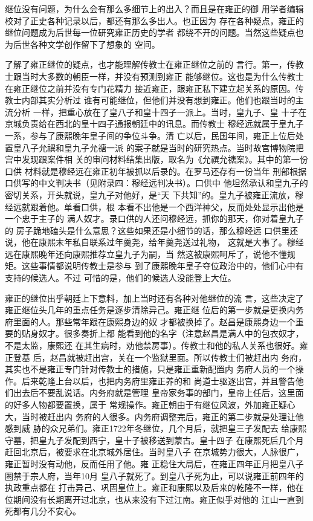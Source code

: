 继位没有问题，为什么会有那么多细节上的出入？而且是在雍正的御%
用学者编辑校对了正史各种记录以后，都还有那么多出人。也正因为%
存在各种疑点，雍正的继位问题成为后世每一位研究雍正历史的学者%
都绕不开的问题。当然这些疑点也为后世各种文学创作留下了想象的%
空间。%
\par
了解了雍正继位的疑点，也才能理解传教士在雍正继位之前的%
言行。第一，传教士跟当时大多数的朝臣一样，并没有预测到雍正%
能够继位。这也是为什么传教士在雍正继位之前并没有专门花精力%
接近雍正，跟雍正私下建立起关系的原因。传教士内部其实分析过%
谁有可能继位，但他们并没有想到雍正。他们也跟当时的主流分析%
一样，把重心放在了皇八子和皇十四子一派上。当时，皇九子、皇%
十子在京城负责给在西北的皇十四子通报朝廷中的讯息。而传教士%
穆经远就属于皇九子一系，参与了康熙晚年皇子间的争位斗争。清%
亡以后，民国年间，雍正上位后处置皇八子允禩和皇九子允禟一派%
的案子就是当时的研究热点。当时故宫博物院把宫中发现跟案件相%
关的审问材料结集出版，取名为《允禩允禟案》。其中的第一份口供%
材料就是穆经远在雍正初年被抓以后录的。在罗马还存有一份当年%
刑部根据口供写的中文判决书（见附录四：穆经远判决书）。口供中%
他坦然承认和皇九子的密切关系，开头就说，皇九子对他好，是“天%
下共知”的。皇九子被雍正流放，穆经远就跟着他。单看口供，根%
本看不出他是一个西洋神父，反而处处显示出他是一个忠于主子的%
满人奴才。录口供的人还问穆经远，抓你的那天，你对着皇九子的%
房子跪地磕头是什么意思？这些如果还是小细节的话，那么穆经远%
口供里还说，他在康熙末年私自联系过年羹尧，给年羹尧送过礼物，%
这就是大事了。穆经远在康熙晚年还向康熙推荐立皇九子为嗣，当%
然这被康熙呵斥了，说他不懂规矩。这些事情都说明传教士是参与%
到了康熙晚年皇子夺位政治中的，他们心中有支持的候选人。不过%
可惜的是，他们的候选人没能登上大位。%
\par
雍正的继位出乎朝廷上下意料，加上当时还有各种对他继位的流%
言，这些决定了雍正继位头几年的重点任务是逐步清除异己。雍正继%
位后的第一步就是更换内务府里面的人。那些常年跟在康熙身边的奴%
才都被换掉了。赵昌是康熙身边一个重要的贴身奴才。很多奏折上都%
能看到他的名字（注意赵昌是满人中的包衣奴才，不是太监，康熙还%
在其生病时，劝他禁房事）。传教士和他的私人关系也很好。雍正登基%
后，赵昌就被赶出宫，关在一个监狱里面。所以传教士们被赶出内%
务府，其实也不是雍正专门针对传教士的措施，只是雍正重新配置内%
务府人员的一个操作。后来乾隆上台以后，也把内务府里雍正养的和%
尚道士驱逐出宫，并且警告他们出去后不要乱说话。内务府就是管理%
皇帝家务事的部门，皇帝上任后，这里面的好多人物都要置换，属于%
常规操作。雍正朝由于有继位风波，外加雍正疑心大，当时被赶出内%
务府的人很多。内务府调整完后，雍正的第二步就是处理让他感到威%
胁的众兄弟们。雍正1722年冬继位，几个月后，就把皇三子发配去%
给康熙守墓，把皇九子发配到西宁，皇十子被移送到蒙古。皇十四子%
在康熙死后几个月赶回北京后，被要求在北京城外居住。当时皇八子%
在京城势力很大，人脉很广，雍正暂时没有动他，反而任用了他。雍%
正稳住大局后，在雍正四年正月把皇八子圈禁于宗人府，当年10月%
皇八子就死了。到皇八子死为止，可以说雍正前四年的执政重点都在%
打击异己、巩固皇位上。雍正和康熙以及后来的乾隆不一样，他在%
位期间没有长期离开过北京，也从来没有下过江南。雍正似乎对他的%
江山一直到死都有几分不安心。%

